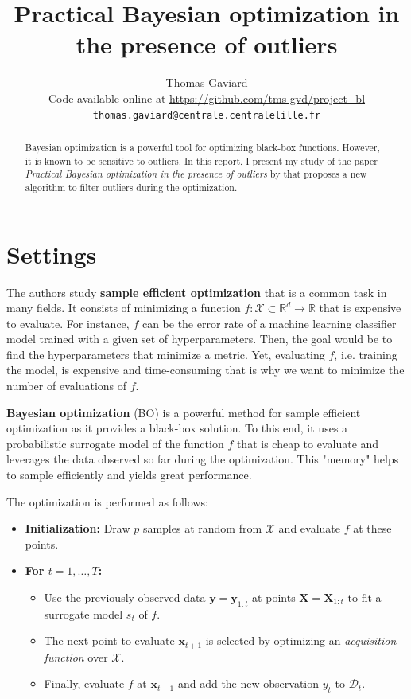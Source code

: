 \documentclass{article}
\title{Practical Bayesian optimization in the presence of outliers}
\author{%
  Thomas Gaviard\\
  Code available online at \url{https://github.com/tms-gvd/project_bl}\\
  \texttt{thomas.gaviard@centrale.centralelille.fr}
}
\newcommand{\x}{\mathbf{x}}
\newcommand{\y}{\mathbf{y}}
\newcommand{\X}{\mathbf{X}}
\newcommand{\cX}{\mathcal{X}}
\newcommand{\RR}{\mathbb{R}}
\begin{document}
\maketitle

\begin{abstract}
  Bayesian optimization is a powerful tool for optimizing black-box functions. However, it is known to be sensitive to outliers. In this report, I present my study of the paper \textit{Practical Bayesian optimization in the presence of outliers} by \cite{martinez-cantinPracticalBayesianOptimization2017} that proposes a new algorithm to filter outliers during the optimization.
\end{abstract}


\section{Settings}

The authors study \textbf{sample efficient optimization} that is a common task in many fields. It consists of minimizing a function $f : \cX \subset \RR^d \rightarrow \RR$ that is expensive to evaluate. For instance, $f$ can be the error rate of a machine learning classifier model trained with a given set of hyperparameters. Then, the goal would be to find the hyperparameters that minimize a metric. Yet, evaluating $f$, i.e. training the model, is expensive and time-consuming that is why we want to minimize the number of evaluations of $f$.

\textbf{Bayesian optimization} (BO) is a powerful method for sample efficient optimization as it provides a black-box solution. To this end, it uses a probabilistic surrogate model of the function $f$ that is cheap to evaluate and leverages the data observed so far during the optimization. This "memory" helps to sample efficiently and yields great performance.

The optimization is performed as follows:
\begin{itemize}
  \item \textbf{Initialization:} Draw $p$ samples at random from $\cX$ and evaluate $f$ at these points.
  \item \textbf{For $t = 1, \dots, T$:}
  \begin{itemize}
    \item Use the previously observed data $\y=\y_{1:t}$ at points $\X=\X_{1:t}$ to fit a surrogate model $s_t$ of $f$. 
    \item The next point to evaluate $\x_{t+1}$ is selected by optimizing an \textit{acquisition function} over $\cX$.
    \item Finally, evaluate $f$ at $\x_{t+1}$ and add the new observation $y_t$ to $\mathcal{D}_t$.
  \end{itemize}
\end{itemize}
\end{document}
